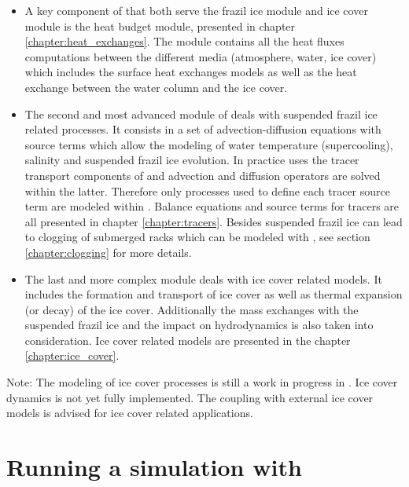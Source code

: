 \begin{itemize}
    \item A key component of \khione that both serve the frazil ice module and ice cover module is the heat budget module,
presented in chapter \ref{chapter:heat_exchanges}.
The module contains all the heat fluxes computations between the different media (atmosphere, water, ice cover) which includes the surface heat exchanges models as well as the heat exchange between the water column and the ice cover.

    \item The second and most advanced module of \khione deals with suspended frazil ice related processes.
It consists in a set of advection-diffusion equations with source terms which allow
the modeling of water temperature (supercooling), salinity and suspended frazil ice evolution.
In practice \khione uses the tracer transport components of  and
advection and diffusion operators are solved within the latter. Therefore only processes
used to define each tracer source term are modeled within \khione.
Balance equations and source terms for tracers are all presented in chapter \ref{chapter:tracers}.
Besides suspended frazil ice can lead to clogging of
submerged racks which can be modeled with \khione, see section \ref{chapter:clogging} for more details.
    \item The last and more complex module deals with ice cover related models. It includes the formation and transport of
ice cover as well as thermal expansion (or decay) of the ice cover. Additionally the mass exchanges with the suspended frazil ice and the impact on hydrodynamics is also taken into consideration. Ice cover related models are presented in the chapter \ref{chapter:ice_cover}.

\end{itemize}


\begin{WarningBlock}{Note:}
    The modeling of ice cover processes is still a work in progress in \khione.
    Ice cover dynamics is not yet fully implemented. The coupling with external ice cover models is advised for ice cover related applications.
\end{WarningBlock}

\section{Running a simulation with \khione}

